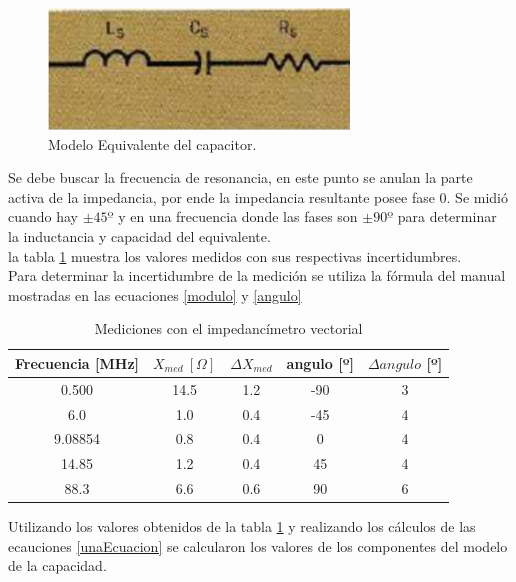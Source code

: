 \documentclass[a4paper,10pt]{article}
\begin{document}
		\begin{figure}[!htb]
			\centering
			\includegraphics[width=8cm]{Imagenes/EsqCapacitor.png}
			\caption{Modelo Equivalente del capacitor.}
			\label{imagenCapacitor} 
		\end{figure}
		
		Se debe buscar la frecuencia de resonancia, en este punto se anulan la 
		parte activa de la impedancia, por ende la impedancia resultante posee
		fase 0. Se midió cuando hay $\pm 45º$ y en una frecuencia donde las fases
		son $\pm 90º$ para determinar la inductancia y capacidad del equivalente.
		\\
		\indent la tabla \ref{unaTab} muestra los valores medidos con sus 
		respectivas incertidumbres. \\
		\indent Para determinar la incertidumbre de la medición se utiliza la 
		fórmula del manual mostradas en las ecuaciones \ref{modulo} y 
		\ref{angulo}
		
		\begin{table}[!htp]
			\centering
			\begin{tabular}{|c|c|c|c|c|}
				\hline
				Frecuencia [MHz] & $X_{med}~[\Omega] $ & $\Delta X_{med}$ & 
				angulo [º] & $\Delta angulo$ [º] \\
				\hline
				0.500 & 14.5 & 1.2 & -90 & 3 \\
				\hline
				6.0 & 1.0 & 0.4 & -45 & 4 \\
				\hline
				9.08854 & 0.8 & 0.4 & 0 & 4 \\ 
				\hline
				14.85 & 1.2 & 0.4 & 45 & 4 \\
				\hline
				88.3 & 6.6 & 0.6 & 90 & 6 \\ 
				\hline									
			\end{tabular}
			\caption{Mediciones con el impedancímetro vectorial} \label{unaTab}
		\end{table}

		\indent Utilizando los valores obtenidos de la tabla \ref{unaTab} y 
		realizando los cálculos de las ecauciones \ref{unaEcuacion} se 
		calcularon los valores de los componentes del modelo de la capacidad. \\
		
\end{document}
